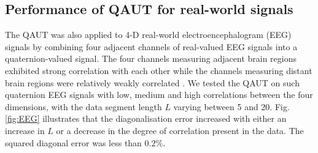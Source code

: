 \documentclass[review]{elsarticle}
\theoremstyle{plain}
\theoremstyle{remark}
\theoremstyle{plain}
\theoremstyle{definition}
\theoremstyle{prop}
\theoremstyle{definition}
\theoremstyle{plain}
\theoremstyle{plain}
\begin{document}
\subsection{Performance of QAUT for real-world signals}
The QAUT was also applied to 4-D real-world electroencephalogram (EEG) signals by combining four adjacent channels of real-valued EEG signals into a quaternion-valued signal. The four channels measuring adjacent brain regions exhibited strong correlation with each other while the channels measuring distant brain regions were relatively weakly correlated \cite{Park2014,enshaeifar2016quaternion}. We tested the QAUT on such quaternion EEG signals with low, medium and high correlations between the four dimensions, with the data segment length $L$ varying between 5 and 20. Fig. \ref{fig:EEG} illustrates that the diagonalisation error increased with either an increase in $L$ or a decrease in the degree of correlation present in the data. The squared diagonal error was less than $0.2\%$.
\end{document}
